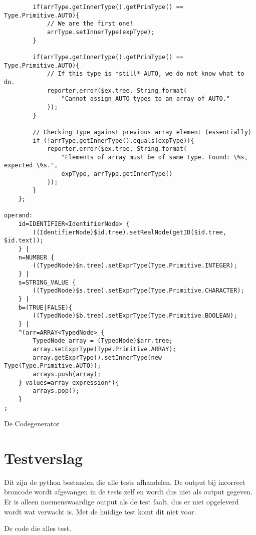 \begin{landscape}
\begin{lstlisting}
        if(arrType.getInnerType().getPrimType() == Type.Primitive.AUTO){
            // We are the first one!
            arrType.setInnerType(expType);
        }

        if(arrType.getInnerType().getPrimType() == Type.Primitive.AUTO){
            // If this type is *still* AUTO, we do not know what to do.
            reporter.error($ex.tree, String.format(
                "Cannot assign AUTO types to an array of AUTO."
            ));
        }

        // Checking type against previous array element (essentially)
        if (!arrType.getInnerType().equals(expType)){
            reporter.error($ex.tree, String.format(
                "Elements of array must be of same type. Found: \%s, expected \%s.",
                expType, arrType.getInnerType()
            ));
        }
    };

operand:
    id=IDENTIFIER<IdentifierNode> {
        ((IdentifierNode)$id.tree).setRealNode(getID($id.tree, $id.text));
    } |
    n=NUMBER {
        ((TypedNode)$n.tree).setExprType(Type.Primitive.INTEGER);
    } |
    s=STRING_VALUE {
        ((TypedNode)$s.tree).setExprType(Type.Primitive.CHARACTER);
    } |
    b=(TRUE|FALSE){
        ((TypedNode)$b.tree).setExprType(Type.Primitive.BOOLEAN);
    } |
    ^(arr=ARRAY<TypedNode> {
        TypedNode array = (TypedNode)$arr.tree;
        array.setExprType(Type.Primitive.ARRAY);
        array.getExprType().setInnerType(new Type(Type.Primitive.AUTO));
        arrays.push(array);
    } values=array_expression*){
        arrays.pop();
    } 
;
\end{lstlisting}

De Codegenerator

\clearpage

\section{Testverslag} %
\label{sec:testverslag}
Dit zijn de python bestanden die alle tests afhandelen. De output bij incorrect broncode wordt afgevangen in de tests zelf en wordt dus niet als output gegeven. Er is alleen noemenswaardige output als de test faalt, dus er niet opgeleverd wordt wat verwacht is. Met de huidige test komt dit niet voor.

De code die alles test.

\end{landscape}
